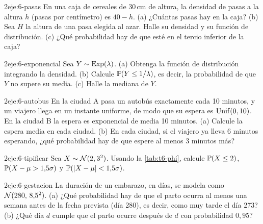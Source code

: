 \begin{ejercicio}{2}{eje:6-pasas}
En una caja de cereales de 30\,cm de altura, la densidad de pasas a la altura $h$ (pasas por centímetro) es $40-h$. (a) ¿Cuántas pasas hay en la caja? (b) Sea $H$ la altura de una pasa elegida al azar. Halle su densidad y su función de distribución. (c) ¿Qué probabilidad hay de que esté en el tercio inferior de la caja?
\end{ejercicio}

\begin{ejercicio}{2}{eje:6-exponencial}
Sea $Y\sim\operatorname{Exp}(\lambda)$. (a) Obtenga la función de distribución integrando la densidad. (b) Calcule $\mathbb{P}(Y\le1/\lambda)$, es decir, la probabilidad de que $Y$ no supere su media. (c) Halle la mediana de $Y$.
\end{ejercicio}

\begin{ejercicio}{2}{eje:6-autobus}
En la ciudad A pasa un autobús exactamente cada 10 minutos, y un viajero llega en un instante uniforme, de modo que su espera es $\operatorname{Unif}(0,10)$. En la ciudad B la espera es exponencial de media 10 minutos. (a) Calcule la espera media en cada ciudad. (b) En cada ciudad, si el viajero ya lleva 6 minutos esperando, ¿qué probabilidad hay de que espere al menos 3 minutos más?
\end{ejercicio}

\begin{ejercicio}{2}{eje:6-tipificar}
Sea $X\sim\mathcal{N}(2,3^{2})$. Usando la \cref{tab:t6-phi}, calcule $\mathbb{P}(X\le2)$, $\mathbb{P}(X-\mu>1{,}5\sigma)$ y $\mathbb{P}(\lvert X-\mu\rvert<1{,}5\sigma)$.
\end{ejercicio}

\begin{ejercicio}{2}{eje:6-gestacion}
La duración de un embarazo, en días, se modela como $\mathcal{N}(280,\,8{,}5^{2})$. (a) ¿Qué probabilidad hay de que el parto ocurra al menos una semana antes de la fecha prevista (día 280), es decir, como muy tarde el día 273? (b) ¿Qué día $d$ cumple que el parto ocurre después de $d$ con probabilidad $0{,}95$?
\end{ejercicio}


